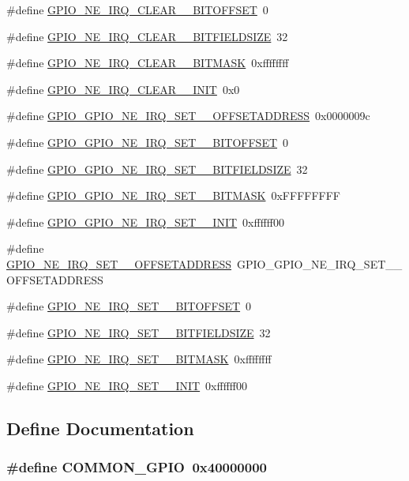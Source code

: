 \begin{DoxyCompactItemize}
\item 
\#define \hyperlink{a00553_ab6b6aadae3c35d00716c59c4782e208a}{GPIO\_\-NE\_\-IRQ\_\-CLEAR\_\_\-BITOFFSET}~0
\item 
\#define \hyperlink{a00553_aabfde77063de50e3f8a144302731127f}{GPIO\_\-NE\_\-IRQ\_\-CLEAR\_\_\-BITFIELDSIZE}~32
\item 
\#define \hyperlink{a00553_acc67ef30486cecf6ec68d97499189ea7}{GPIO\_\-NE\_\-IRQ\_\-CLEAR\_\_\-BITMASK}~0xffffffff
\item 
\#define \hyperlink{a00553_a1886b7c12df38aa73c7658f395f666fd}{GPIO\_\-NE\_\-IRQ\_\-CLEAR\_\_\-INIT}~0x0
\item 
\#define \hyperlink{a00553_a0a2e76ce488222a6b7c0826610c1a7e8}{GPIO\_\-GPIO\_\-NE\_\-IRQ\_\-SET\_\_\-OFFSETADDRESS}~0x0000009c
\item 
\#define \hyperlink{a00553_a6e66758736e7116e4aabd6dd2b6eef48}{GPIO\_\-GPIO\_\-NE\_\-IRQ\_\-SET\_\_\-BITOFFSET}~0
\item 
\#define \hyperlink{a00553_a45c5e5154746920b9e48a476f00c22c3}{GPIO\_\-GPIO\_\-NE\_\-IRQ\_\-SET\_\_\-BITFIELDSIZE}~32
\item 
\#define \hyperlink{a00553_ab5b56e3928b39247c4df81f9d30e4b13}{GPIO\_\-GPIO\_\-NE\_\-IRQ\_\-SET\_\_\-BITMASK}~0xFFFFFFFF
\item 
\#define \hyperlink{a00553_a8379868945b633bd145d6222f63ec228}{GPIO\_\-GPIO\_\-NE\_\-IRQ\_\-SET\_\_\-INIT}~0xffffff00
\item 
\#define \hyperlink{a00553_ac7bc4766321c7ff815fa0362c0a3a7e5}{GPIO\_\-NE\_\-IRQ\_\-SET\_\_\-OFFSETADDRESS}~GPIO\_\-GPIO\_\-NE\_\-IRQ\_\-SET\_\_\-OFFSETADDRESS
\item 
\#define \hyperlink{a00553_aef8351cdc50aa4551573e7018c0866d9}{GPIO\_\-NE\_\-IRQ\_\-SET\_\_\-BITOFFSET}~0
\item 
\#define \hyperlink{a00553_ad35f8dc7a486aa353b447944ef879cc1}{GPIO\_\-NE\_\-IRQ\_\-SET\_\_\-BITFIELDSIZE}~32
\item 
\#define \hyperlink{a00553_af2fcebb2a713369ccd1f58b5a3b2b4c0}{GPIO\_\-NE\_\-IRQ\_\-SET\_\_\-BITMASK}~0xffffffff
\item 
\#define \hyperlink{a00553_a7939fe65199eeb32c2fd290c35373805}{GPIO\_\-NE\_\-IRQ\_\-SET\_\_\-INIT}~0xffffff00
\end{DoxyCompactItemize}


\subsection{Define Documentation}
\hypertarget{a00553_aacfc134a5216df66d88112b4198b522e}{
\subsubsection[{COMMON\_\-GPIO}]{\setlength{\rightskip}{0pt plus 5cm}\#define COMMON\_\-GPIO~0x40000000}}
\label{a00553_aacfc134a5216df66d88112b4198b522e}


